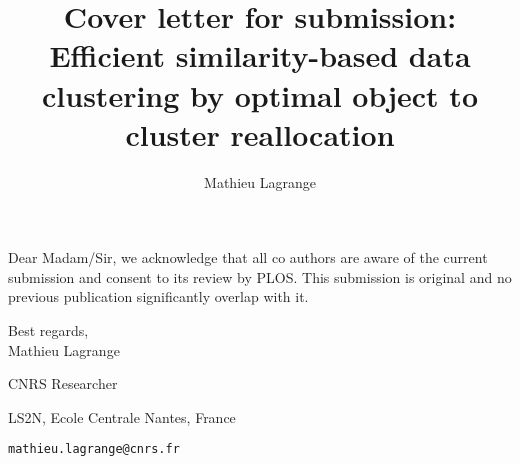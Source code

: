 \documentclass[10pt]{article}
\title{Cover letter for submission: \\
Efficient similarity-based data clustering by optimal object to cluster reallocation}
\author{Mathieu Lagrange}
\begin{document}
\maketitle

Dear Madam/Sir, we acknowledge that all co authors are aware of the current submission and consent to its review by PLOS. This submission is original and no previous publication significantly overlap with it.

\vspace{1cm}

Best regards,\\

Mathieu Lagrange

CNRS Researcher

LS2N, Ecole Centrale Nantes, France

\texttt{mathieu.lagrange@cnrs.fr}
\end{document}
